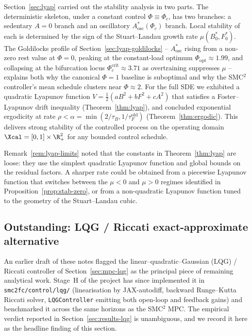 Section~\ref{sec:lyap} carried out the stability analysis in two
parts. The deterministic skeleton, under a constant control
$\Phi \equiv \Phi_c$, has two branches: a sedentary $A=0$ branch and
an oscillatory $A^*_{\mathrm{osc}}(\Phi_c)$ branch. Local stability of
each is determined by the sign of the Stuart--Landau growth rate
$\mu(B^*_0,F^*_0)$. The Goldilocks profile of
Section~\ref{sec:lyap-goldilocks} -- $A^*_{\mathrm{osc}}$ rising
from a non-zero rest value at $\Phi=0$, peaking at the constant-load
optimum $\Phi_{\mathrm{opt}} \approx 1.99$, and collapsing at the
bifurcation locus $\Phi_c^{\mathrm{crit}} \approx 3.71$ as
overtraining suppresses $\mu$ -- explains both why the canonical
$\Phi=1$ baseline is suboptimal and why the SMC${}^2$ controller's
mean schedule clusters near $\Phi \approx 2$. For the full
SDE we exhibited a quadratic Lyapunov function
$V = \tfrac12(aB^2+bF^2+cA^2)$ that satisfies a Foster--Lyapunov drift
inequality (Theorem~\ref{thm:lyap}), and concluded exponential
ergodicity at rate
$\rho < \alpha = \min(2/\tau_B,1/\tau_F^{\mathrm{old}})$
(Theorem~\ref{thm:ergodic}). This delivers strong stability of the
controlled process on the operating domain
$\Xcal = [0,1]\times\R_+^2$ for any bounded control schedule.

Remark~\ref{rem:lyap-limits} noted that the constants in
Theorem~\ref{thm:lyap} are loose: they use the simplest quadratic
Lyapunov function and global bounds on the residual factors. A
sharper rate could be obtained from a piecewise Lyapunov function
that switches between the $\mu < 0$ and $\mu > 0$ regimes identified
in Proposition~\ref{prop:stab-zero}, or from a non-quadratic Lyapunov
function tuned to the geometry of the Stuart--Landau cubic.

\subsection{Outstanding: LQG / Riccati
exact-approximate alternative}\label{sec:discussion-lqg}

An earlier draft of these notes flagged the
linear--quadratic--Gaussian (LQG) / Riccati controller of
Section~\ref{sec:mpc-lqg} as the principal piece of remaining
analytical work. Stage~H of the project has since implemented it in
\texttt{smc2fc/control/lqg/} (linearisation by JAX-autodiff, backward
Runge--Kutta Riccati solver, \texttt{LQGController} emitting both
open-loop and feedback gains) and benchmarked it across the same
horizons as the SMC${}^2$ MPC. The empirical verdict reported in
Section~\ref{sec:results-lqg} is unambiguous, and we record it here
as the headline finding of this section.

